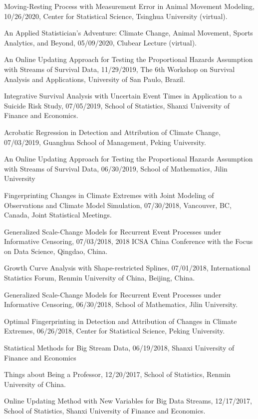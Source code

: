 \documentclass[Statistics]{vita}
\begin{document}
\begin{vita}
\begin{InvitedTalksLectures}
\begin{InvitedTalks}
  \item Moving-Resting Process with Measurement Error in Animal Movement Modeling, 10/26/2020, Center for Statistical Science, Tsinghua University (virtual).
  \item An Applied Statistician's Adventure: Climate Change, Animal Movement, Sports Analytics, and Beyond, 05/09/2020, Clubear Lecture (virtual).
  \item An Online Updating Approach for Testing the Proportional Hazards Assumption with Streams of Survival Data, 11/29/2019, The 6th Workshop on Survival Analysis and Applications, University of San Paulo, Brazil.
  \item Integrative Survival Analysis with Uncertain Event Times in Application to a Suicide Risk Study, 07/05/2019, School of Statistics, Shanxi University of Finance and Economics.
  \item Acrobatic Regression in Detection and Attribution of Climate Change, 07/03/2019, Guanghua School of Management, Peking University.
  \item An Online Updating Approach for Testing the Proportional Hazards Assumption with Streams of Survival Data, 06/30/2019, School of Mathematics, Jilin University
  \item Fingerprinting Changes in Climate Extremes with Joint Modeling of Observations and Climate Model Simulation, 07/30/2018, Vancouver, BC, Canada, Joint Statistical Meetings.
  \item Generalized Scale-Change Models for Recurrent Event Processes under Informative Censoring, 07/03/2018, 2018 ICSA China Conference with the Focus on Data Science, Qingdao, China.
  \item Growth Curve Analysis with Shape-restricted Splines, 07/01/2018, International Statistics Forum, Renmin University of China, Beijing, China.
  \item Generalized Scale-Change Models for Recurrent Event Processes under Informative Censoring, 06/30/2018, School of Mathematics, Jilin University.
  \item Optimal Fingerprinting in Detection and Attribution of Changes in Climate Extremes, 06/26/2018, Center for Statistical Science, Peking University.
  \item Statistical Methods for Big Stream Data, 06/19/2018, Shanxi University of Finance and Economics
  \item Things about Being a Professor, 12/20/2017, School of Statistics, Renmin University of China.
  \item Online Updating Method with New Variables for Big Data Streams, 12/17/2017, School of Statistics, Shanxi University of Finance and Economics.

\end{InvitedTalks}
\end{InvitedTalksLectures}
\end{vita}
\end{document}
